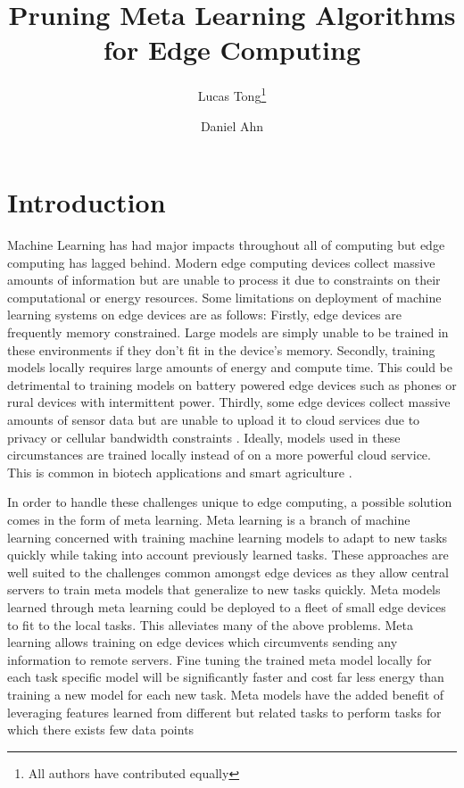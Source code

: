 \documentclass[twocolumn, 10pt]{article}
\begin{document}
\title{Pruning Meta Learning Algorithms for Edge Computing}

\author{Lucas Tong\thanks{All authors have contributed equally} \and Daniel Ahn \footnotemark[1]}
\maketitle

\section{Introduction}
Machine Learning has had major impacts throughout all of computing but edge computing has lagged behind. Modern edge computing devices collect massive amounts of information but are unable to process it due to constraints on their computational or energy resources. Some limitations on deployment of machine learning systems on edge devices are as follows: Firstly, edge devices are frequently memory constrained. Large models are simply unable to be trained in these environments if they don't fit in the device's memory. Secondly, training models locally requires large amounts of energy and compute time. This could be detrimental to training models on battery powered edge devices such as phones or rural devices with intermittent power. Thirdly, some edge devices collect massive amounts of sensor data but are unable to upload it to cloud services due to privacy \cite{bioboios} or cellular bandwidth constraints \cite{lin2020realtime}. Ideally, models used in these circumstances are trained locally instead of on a more powerful cloud service. This is common in biotech applications \cite{bioboios} and smart agriculture \cite{farmerhicks}. 

In order to handle these challenges unique to edge computing, a possible solution comes in the form of meta learning. Meta learning is a branch of machine learning concerned with training machine learning models to adapt to new tasks quickly while taking into account previously learned tasks. These approaches are well suited to the challenges common amongst edge devices as they allow central servers to train meta models that generalize to new tasks quickly. Meta models learned through meta learning could be deployed to a fleet of small edge devices to fit to the local tasks. This alleviates many of the above problems. Meta learning allows training on edge devices which circumvents sending any information to remote servers. Fine tuning the trained meta model locally for each task specific model will be significantly faster and cost far less energy than training a new model for each new task. Meta models have the added benefit of leveraging features learned from different but related tasks to perform tasks for which there exists few data points
\end{document}
